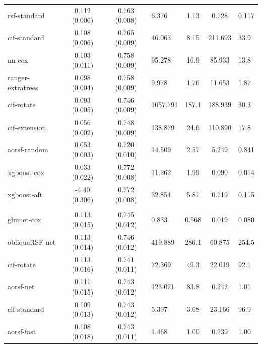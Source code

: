 \documentclass[twoside,11pt]{article}\usepackage[]{graphicx}\usepackage[]{xcolor}
\newenvironment{knitrout}{}{} %
\begin{document}
\begin{knitrout}
\begin{longtable}{lcclccl}
\hspace{1em}rsf-standard & 0.112 (0.006) & 0.763 (0.008) & 6.376 & 1.13 & 0.728 & 0.117\\
\hspace{1em}cif-standard & 0.108 (0.006) & 0.765 (0.009) & 46.063 & 8.15 & 211.693 & 33.9\\
\hspace{1em}nn-cox & 0.103 (0.011) & 0.758 (0.009) & 95.278 & 16.9 & 85.933 & 13.8\\
\hspace{1em}ranger-extratrees & 0.098 (0.004) & 0.758 (0.009) & 9.978 & 1.76 & 11.653 & 1.87\\
\hspace{1em}cif-rotate & 0.093 (0.005) & 0.746 (0.009) & 1057.791 & 187.1 & 188.939 & 30.3\\
\hspace{1em}cif-extension & 0.056 (0.002) & 0.748 (0.009) & 138.879 & 24.6 & 110.890 & 17.8\\
\hspace{1em}aorsf-random & 0.053 (0.003) & 0.720 (0.010) & 14.509 & 2.57 & 5.249 & 0.841\\
\hspace{1em}xgboost-cox & 0.033 (0.022) & 0.772 (0.008) & 11.262 & 1.99 & 0.090 & 0.014\\
\hspace{1em}xgboost-aft & -4.40 (0.306) & 0.772 (0.008) & 32.854 & 5.81 & 0.719 & 0.115\\
\addlinespace[0.3em]
\hline
\multicolumn{7}{l}{\textit{\textbf{Systolic Heart Failure; death, n = 2231, p = 41}}}\\
\hline
\hspace{1em}glmnet-cox & 0.113 (0.015) & 0.745 (0.012) & 0.833 & 0.568 & 0.019 & 0.080\\
\hspace{1em}obliqueRSF-net & 0.113 (0.014) & 0.746 (0.012) & 419.889 & 286.1 & 60.875 & 254.5\\
\hspace{1em}cif-rotate & 0.113 (0.016) & 0.741 (0.011) & 72.369 & 49.3 & 22.019 & 92.1\\
\hspace{1em}aorsf-net & 0.111 (0.015) & 0.743 (0.012) & 123.021 & 83.8 & 0.242 & 1.01\\
\hspace{1em}cif-standard & 0.109 (0.013) & 0.743 (0.012) & 5.397 & 3.68 & 23.166 & 96.9\\
\hspace{1em}aorsf-fast & 0.108 (0.018) & 0.743 (0.011) & 1.468 & 1.00 & 0.239 & 1.00\\

\end{longtable}
\end{knitrout}
\end{document}

